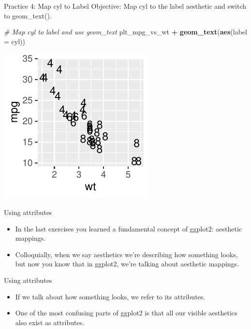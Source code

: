 \documentclass[
  ignorenonframetext,
]{beamer}
\newenvironment{Shaded}{\begin{snugshade}}{\end{snugshade}}
\newcommand{\AttributeTok}[1]{\textcolor[rgb]{0.13,0.29,0.53}{#1}}
\newcommand{\CommentTok}[1]{\textcolor[rgb]{0.56,0.35,0.01}{\textit{#1}}}
\newcommand{\FunctionTok}[1]{\textcolor[rgb]{0.13,0.29,0.53}{\textbf{#1}}}
\newcommand{\NormalTok}[1]{#1}
\newcommand{\SpecialCharTok}[1]{\textcolor[rgb]{0.81,0.36,0.00}{\textbf{#1}}}
\begin{document}
\begin{frame}[fragile]{Practice 4: Map cyl to Label}
\label{practice-4-map-cyl-to-label}
Objective: Map cyl to the label aesthetic and switch to geom\_text().

\begin{Shaded}
\begin{Highlighting}[]
\CommentTok{\# Map cyl to label and use geom\_text}
\NormalTok{plt\_mpg\_vs\_wt }\SpecialCharTok{+} \FunctionTok{geom\_text}\NormalTok{(}\FunctionTok{aes}\NormalTok{(}\AttributeTok{label =}\NormalTok{ cyl))}
\end{Highlighting}
\end{Shaded}

\begin{center}\includegraphics[width=0.5\linewidth]{Figs/unnamed-chunk-20-1} \end{center}
\end{frame}

\begin{frame}{Using attributes}
\label{using-attributes}
\begin{itemize}
\item
  In the last exercises you learned a fundamental concept of ggplot2:
  aesthetic mappings.
\item
  Colloquially, when we say aesthetics we're describing how something
  looks, but now you know that in ggplot2, we're talking about aesthetic
  mappings.
\end{itemize}
\end{frame}

\begin{frame}{Using attributes}
\label{using-attributes-1}
\begin{itemize}
\item
  If we talk about how something looks, we refer to its attributes.
\item
  One of the most confusing parts of ggplot2 is that all our visible
  aesthetics also exist as attributes.
\end{itemize}
\end{frame}
\end{document}
